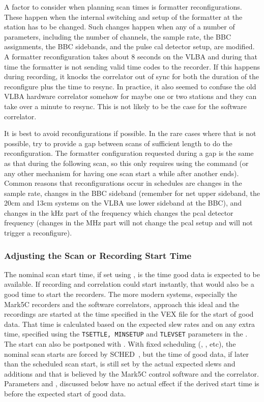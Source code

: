 \documentclass{report}
\newcommand{\schedb}{{\sc SCHED~}}
\begin{document}
A factor to consider when planning scan times is formatter
reconfigurations.  These happen when the internal switching and setup
of the formatter at the station has to be changed.  Such changes
happen when any of a number of parameters, including the number of
channels, the sample rate, the BBC assignments, the BBC sidebands, and
the pulse cal detector setup, are modified.  A formatter
reconfiguration takes about 8 seconds on the VLBA and during that time
the formatter is not sending valid time codes to the recorder.  If
this happens during recording, it knocks the correlator out of sync
for both the duration of the reconfigure plus the time to resync.  In
practice, it also seemed to confuse the old VLBA hardware correlator
somehow for maybe one or two stations and they can take over a minute
to resync.  This is not likely to be the case for the software
correlator.

It is best to avoid reconfigurations if possible.  In the rare cases
where that is not possible, try to provide a gap between scans of
sufficient length to do the reconfiguration.  The formatter
configuration requested during a gap is the same as that during the
following scan, so this only requires using the  command (or any other mechanism for having one scan
start a while after another ends).  Common reasons that
reconfigurations occur in schedules are changes in the sample rate,
changes in the BBC sideband (remember for net upper sideband, the 20cm
and 13cm systems on the VLBA use lower sideband at the BBC), and
changes in the kHz part of the frequency which changes the pcal
detector frequency (changes in the MHz part will not change the pcal
setup and will not trigger a reconfigure).

\subsubsection{\label{SSSEC:Starttime}Adjusting the Scan or Recording
Start Time}

The nominal scan start time, if set using , is the time good data is expected to be available.
If recording and correlation could start instantly, that would also be
a good time to start the recorders.  The more modern systems,
especially the Mark5C recorders and the software correlators, approach
this ideal and the recordings are started at the time specified in the
VEX file for the start of good data.  That time is calculated based on
the expected slew rates and on any extra time, specified using the
{\tt TSETTLE, MINSETUP} and {\tt TLEVSET} parameters in the
.  The start can also be
postponed with .  With fixed scheduling
(, , etc),
the nominal scan starts are forced by \schedb, but the time of good
data, if later than the scheduled scan start, is still set by the
actual expected slews and additions and that is believed by the Mark5C
control software and the correlator.  Parameters  and ,
discussed below have no actual effect if the derived start time is
before the expected start of good data.
\end{document}
